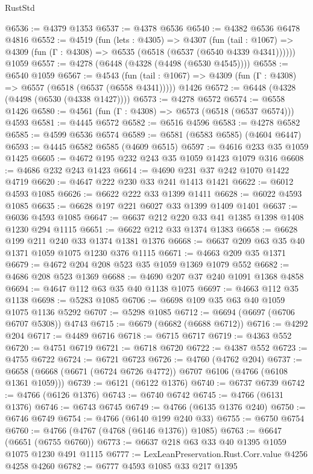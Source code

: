 \begin{lexlean}{RustStd}
\begin{coremodule}
{\begin{coremodule}
{{{{{{{{{{{{{{{{{{{{{{{{{{{{{{{{{{{@6536 := @4379 @1353
@6537 := @4378 @6536
@6540 := @4382 @6536 @6478 @4816
@6552 := @4519
    (fun (lets : @4305) =>
    @4307
      (fun (tail : @1067) => @4309 (fun (Γ : @4308) => @6535 (@6518 (@6537 (@6540 @4339 @4341))))))
    @1059
@6557 := @4278 (@6448 (@4328 (@4498 (@6530 @4545))))
@6558 := @6540 @1059
@6567 := @4543
    (fun (tail : @1067) => @4309 (fun (Γ : @4308) => @6557 (@6518 (@6537 (@6558 @4341)))))
    @1426
@6572 := @6448 (@4328 (@4498 (@6530 (@4338 @1427))))
@6573 := @4278 @6572
@6574 := @6558 @1426
@6580 := @4561 (fun (Γ : @4308) => @6573 (@6518 (@6537 @6574))) @4593
@6581 := @4445 @6572
@6582 := @6516 @4596
@6583 := @4278 @6582
@6585 := @4599 @6536 @6574
@6589 := @6581 (@6583 @6585) (@4604 @6447)
@6593 := @4445 @6582 @6585 (@4609 @6515)
@6597 := @4616 @233 @35 @1059 @1425
@6605 := @4672 @195 @232 @243 @35 @1059 @1423 @1079 @316
@6608 := @4686 @232 @243 @1423
@6614 := @4690 @231 @37 @242 @1070 @1422 @4719
@6620 := @4647 @222 @230 @33 @241 @1413 @1421
@6622 := @6012 @4593 @1085
@6626 := @6622 @222 @33 @1399 @1411
@6628 := @6022 @4593 @1085
@6635 := @6628 @197 @221 @6027 @33 @1399 @1409 @1401
@6637 := @6036 @4593 @1085
@6647 := @6637 @212 @220 @33 @41 @1385 @1398 @1408 @1230 @294 @1115
@6651 := @6622 @212 @33 @1374 @1383
@6658 := @6628 @199 @211 @240 @33 @1374 @1381 @1376
@6668 := @6637 @209 @63 @35 @40 @1371 @1059 @1075 @1230 @376 @1115
@6671 := @4663 @209 @35 @1371
@6679 := @4672 @204 @208 @523 @35 @1059 @1369 @1079 @552
@6682 := @4686 @208 @523 @1369
@6688 := @4690 @207 @37 @240 @1091 @1368 @4858
@6694 := @4647 @112 @63 @35 @40 @1138 @1075
@6697 := @4663 @112 @35 @1138
@6698 := @5283 @1085
@6706 := @6698 @109 @35 @63 @40 @1059 @1075 @1136 @5292
@6707 := @5298 @1085
@6712 := @6694 (@6697 (@6706 @6707 @5308)) @4743
@6715 := @6679 (@6682 (@6688 @6712))
@6716 := @4292 @204
@6717 := @4489 @6716
@6718 := @6715 @6717
@6719 := @4363 @552
@6720 := @4751 @6719
@6721 := @6718 @6720
@6722 := @4387 @552
@6723 := @4755 @6722
@6724 := @6721 @6723
@6726 := @4760 (@4762 @204)
@6737 := @6658 (@6668 (@6671 (@6724 @6726 @4772)) @6707 @6106 (@4766 (@6108 @1361 @1059)))
@6739 := @6121 (@6122 @1376)
@6740 := @6737 @6739
@6742 := @4766 (@6126 @1376)
@6743 := @6740 @6742
@6745 := @4766 (@6131 @1376)
@6746 := @6743 @6745
@6749 := @4766 (@6135 @1376 @240)
@6750 := @6746 @6749
@6754 := @4766 (@6140 @199 @240 @33)
@6755 := @6750 @6754
@6760 := @4766 (@4767 (@4768 (@6146 @1376)) @1085)
@6763 := @6647 (@6651 (@6755 @6760))
@6773 := @6637 @218 @63 @33 @40 @1395 @1059 @1075 @1230 @491 @1115
@6777 := LexLeanPreservation.Rust.Corr.value @4256 @4258 @4260
@6782 := @6777 @4593 @1085 @33 @217 @1395
}}}}}}}}}}}}}}}}}}}}}}}}}}}}}}}}}}}
\end{coremodule}}
\end{coremodule}
\end{lexlean}
